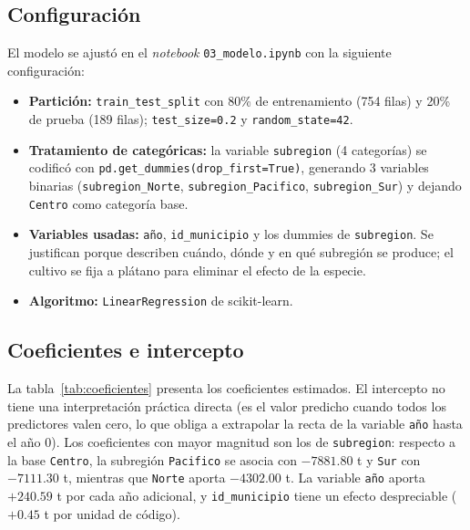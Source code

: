 \documentclass[11pt,a4paper]{article}
\begin{document}
\subsection{Configuración}

El modelo se ajustó en el \emph{notebook} \texttt{03\_modelo.ipynb} con la siguiente configuración:

\begin{itemize}
  \item \textbf{Partición:} \texttt{train\_test\_split} con 80\% de entrenamiento (754 filas) y
        20\% de prueba (189 filas); \texttt{test\_size=0.2} y \texttt{random\_state=42}.
  \item \textbf{Tratamiento de categóricas:} la variable \texttt{subregion} (4 categorías) se
        codificó con \texttt{pd.get\_dummies(drop\_first=}\allowbreak\texttt{True)}, generando 3 variables binarias
        (\texttt{subregion\_Norte}, \texttt{subregion\_Pacifico}, \texttt{subregion\_Sur}) y dejando
        \texttt{Centro} como categoría base.
  \item \textbf{Variables usadas:} \texttt{año}, \texttt{id\_municipio} y los dummies de
        \texttt{subregion}. Se justifican porque describen cuándo, dónde y en qué subregión se
        produce; el cultivo se fija a plátano para eliminar el efecto de la especie.
  \item \textbf{Algoritmo:} \texttt{LinearRegression} de scikit-learn.
\end{itemize}

\subsection{Coeficientes e intercepto}

La tabla~\ref{tab:coeficientes} presenta los coeficientes estimados. El intercepto no tiene una
interpretación práctica directa (es el valor predicho cuando todos los predictores valen cero, lo
que obliga a extrapolar la recta de la variable \texttt{año} hasta el año 0). Los coeficientes con
mayor magnitud son los de \texttt{subregion}: respecto a la base \texttt{Centro}, la subregión
\texttt{Pacifico} se asocia con $-7881.80$ t y \texttt{Sur} con $-7111.30$ t, mientras que
\texttt{Norte} aporta $-4302.00$ t. La variable \texttt{año} aporta $+240.59$ t por cada año
adicional, y \texttt{id\_municipio} tiene un efecto despreciable ($+0.45$ t por unidad de código).
\end{document}
